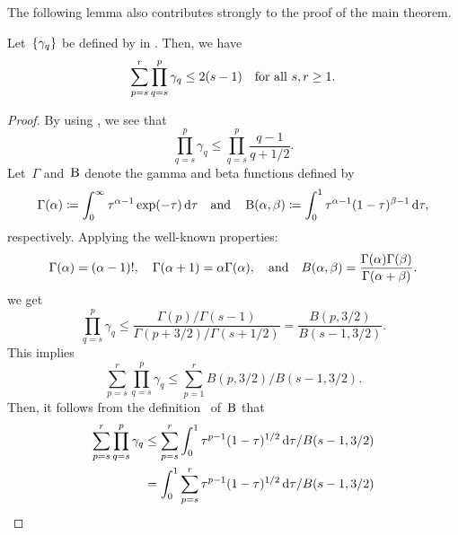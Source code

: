 \documentclass[../main]{subfiles}
\begin{document}
The following lemma also contributes strongly to the proof of the main theorem.
\begin{lemma} 
    Let~$\set*{\gamma_q}$ be defined by  in .
    Then, we have
    \begin{equation}
        \sum_{p = s}^r \prod_{q = s}^p \gamma_q \le 2 ( s - 1) \forallcondition{s, r \ge 1}
    .\end{equation} 
\end{lemma}
\begin{proof}
    By using , we see that
    \begin{equation}
        \prod_{q = s}^{p} \gamma_q \le \prod_{q = s}^{p} \frac{q - 1}{q + 1 / 2} 
    .\end{equation}
    Let~$\Gamma$ and~$\Beta$ denote the gamma and beta functions defined by
    \begin{equation} \label{eq:gamma and beta}
        \Gamma(\alpha) \coloneqq \int_{0}^{\infty} \tau^{\alpha - 1} \exp(-\tau) \odif{\tau} \eqand
        \Beta(\alpha, \beta) \coloneqq \int_{0}^{1} \tau^{\alpha - 1} (1 - \tau)^{\beta - 1} \odif{\tau}
    ,\end{equation}
    respectively.
    Applying the well-known properties:
    \begin{equation} \label{eq:gamma and beta properties}
        \Gamma(\alpha) = (\alpha - 1)!, \quad \Gamma(\alpha + 1) = \alpha \Gamma(\alpha), \eqand B(\alpha, \beta) = \frac{\Gamma(\alpha) \Gamma(\beta)}{\Gamma(\alpha + \beta)}
    .\end{equation}
    we get
    \begin{equation}
        \prod_{q = s}^{p} \gamma_q \le \frac{\Gamma(p) / \Gamma(s - 1)}{\Gamma(p + 3 / 2) / \Gamma(s + 1 / 2)}
        = \frac{B(p, 3 / 2)}{B(s - 1, 3 / 2)}
    .\end{equation} 
    This implies
    \begin{equation}
        \sum_{p = s}^{r} \prod_{q = s}^{p} \gamma_q \le \sum_{p = 1}^{r} B(p, 3 / 2) / B(s - 1, 3 / 2)
    .\end{equation} 
    Then, it follows from the definition~ of~$\Beta$ that
    \begin{equation}
        \begin{split}
            \sum_{p = s}^{r} \prod_{q = s}^{p} \gamma_q 
        &\le \sum_{p = s}^{r} \int_{0}^{1} \tau^{p - 1} (1 - \tau)^{1 / 2} \odif{\tau} / B(s - 1, 3 / 2) \\
        &= \int_{0}^{1} \sum_{p = s}^{r} \tau^{p - 1} (1 - \tau)^{1 / 2} \odif{\tau} / B(s - 1, 3 / 2) \\

\end{split}
\end{equation}
\end{proof}
\end{document}

